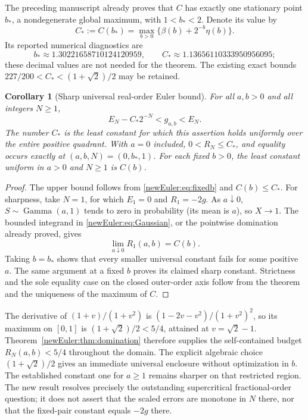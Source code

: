\documentclass[11pt,letterpaper]{article}
\newtheorem{corollary}[theorem]{Corollary}
\theoremstyle{definition}
\theoremstyle{remark}
\begin{document}
The preceding manuscript already proves that $C$ has exactly one
stationary point $b_*$, a nondegenerate global maximum, with
$1<b_*<2$. Denote its value by
\[
 C_*:=C(b_*)=\max_{b>0}\{\beta(b)+2^{-b}\eta(b)\}.
\]
Its reported numerical diagnostics are
\[
 b_*\approx1.30221658710124120959,\qquad
 C_*\approx1.13656110333950956095;
\]
these decimal values are not needed for the theorem. The existing exact
bounds $227/200<C_*<(1+\sqrt2)/2$ may be retained.

\begin{corollary}[Sharp universal real-order Euler bound]
\label{newEuler:cor:sharp}
For all $a,b>0$ and all integers $N\ge1$,
\begin{equation}\label{newEuler:eq:universal}
 E_N-C_*2^{-N}<g_{a,b}<E_N.
\end{equation}
The number $C_*$ is the least constant for which this assertion holds
uniformly over the entire positive quadrant. With $a=0$ included,
$0<R_N\le C_*$, and equality occurs exactly at
$(a,b,N)=(0,b_*,1)$. For each fixed $b>0$, the least constant uniform
in $a>0$ and $N\ge1$ is $C(b)$.
\end{corollary}
\begin{proof}
The upper bound follows from \eqref{newEuler:eq:fixedb} and
$C(b)\le C_*$. For sharpness, take $N=1$, for which $E_1=0$ and
$R_1=-2g$. As $a\downarrow0$, $S\sim\operatorname{Gamma}(a,1)$
tends to zero in probability (its mean is $a$), so $X\to1$.
The bounded integrand in \eqref{newEuler:eq:Gaussian}, or the
pointwise domination already proved, gives
\[
 \lim_{a\downarrow0}R_1(a,b)=C(b).
\]
Taking $b=b_*$ shows that every smaller universal constant fails for
some positive $a$. The same argument at a fixed $b$ proves its
claimed sharp constant. Strictness and the sole equality case on the
closed outer-order axis follow from the theorem and the uniqueness
of the maximum of $C$.
\end{proof}

The derivative of $(1+v)/(1+v^2)$ is
$(1-2v-v^2)/(1+v^2)^2$, so its maximum on $[0,1]$ is
$(1+\sqrt2)/2<5/4$, attained at $v=\sqrt2-1$.
Theorem~\ref{newEuler:thm:domination} therefore supplies the
self-contained budget $R_N(a,b)<5/4$ throughout the domain.
The explicit algebraic choice $(1+\sqrt2)/2$ gives an immediate
universal enclosure without optimization in $b$.
The established constant one for $a\ge1$ remains sharper on that
restricted region. The new result resolves precisely the outstanding
supercritical fractional-order question; it does not assert that the
scaled errors are monotone in $N$ there, nor that the fixed-pair
constant equals $-2g$ there.
\end{document}
